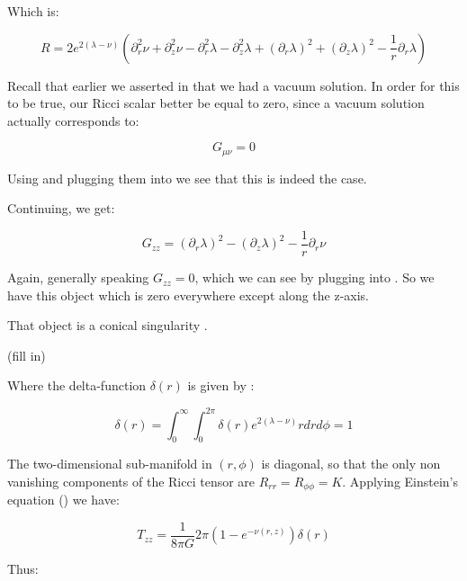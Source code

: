 \documentclass{article}
\begin{document}
Which is:

\begin{equation}
R=2e^{2\left(\lambda-\nu\right)}\left(\partial^{2}_{r}\nu+\partial^{2}_{z}\nu-\partial^{2}_{r}\lambda-\partial^{2}_{z}\lambda+\left(\partial_{r}\lambda\right)^{2}+\left(\partial_{z}\lambda\right)^{2}-\frac{1}{r}\partial_{r}\lambda\right)\label{eq:R}
\end{equation}

Recall that earlier we asserted in  that we had a vacuum solution. In order for this to be true, our Ricci scalar better be equal to zero, since a vacuum solution actually corresponds to:

\begin{equation}
G_{\mu\nu}=0
\end{equation}

Using  and plugging them into  we see that this is indeed the case.

Continuing, we get:

\begin{equation}
G_{zz}=\left(\partial_{r}\lambda\right)^{2}-\left(\partial_{z}\lambda\right)^{2}-\frac{1}{r}\partial_{r}\nu \label{eq:G_zz}
\end{equation}

Again, generally speaking $G_{zz}=0$, which we can see by plugging  into . So we have this object which is zero everywhere except along the z-axis.

That object is a conical singularity \cite{araujo_static_1995}.

(fill in)

Where the delta-function $\delta(r)$ is given by \cite{araujo_static_1995}:

\begin{equation}
\delta(r)=\int^{\infty}_{0} \int^{2\pi}_{0} \delta (r)e^{2\left(\lambda-\nu\right)}rdrd\phi =1
\end{equation} 

The two-dimensional sub-manifold in $\left(r,\phi\right)$ is diagonal, so that the only non vanishing components of the Ricci tensor are $R_{rr}=R_{\phi\phi}=K$. Applying Einstein's equation () we have:

\begin{equation}
T_{zz}=\frac{1}{8\pi G}2\pi\left(1-e^{-\nu (r,z)}\right)\delta(r)
\end{equation} 

Thus:
\end{document}
